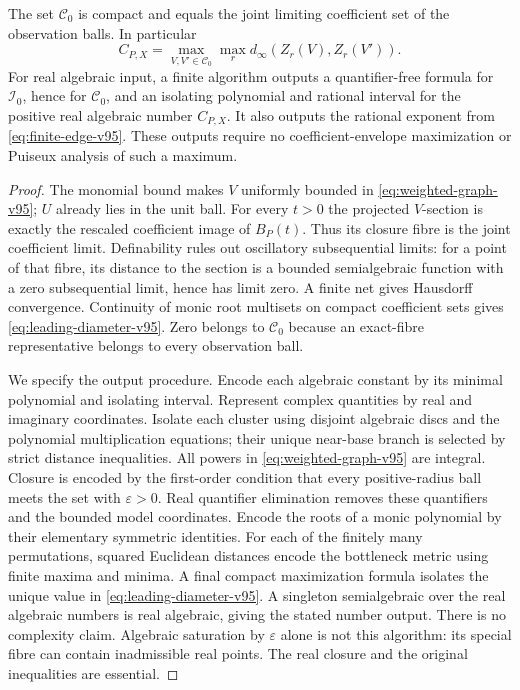 \begin{proposition}
\label{prop:effective-fibre-v95}
The set $\mathscr C_0$ is compact and equals the joint limiting
coefficient set of the observation balls. In particular
\begin{equation}\label{eq:leading-diameter-v95}
 C_{P,X}=\max_{V,V'\in\mathscr C_0}\max_r
                    d_\infty(Z_r(V),Z_r(V')).
\end{equation}
For real algebraic input, a finite algorithm outputs a quantifier-free
formula for $\mathscr I_0$, hence for $\mathscr C_0$, and an isolating
polynomial and rational interval for the positive real algebraic number
$C_{P,X}$. It also outputs the rational exponent from
\eqref{eq:finite-edge-v95}. These outputs require no coefficient-envelope
maximization or Puiseux analysis of such a maximum.
\end{proposition}
\begin{proof}
The monomial bound makes $V$ uniformly bounded in
\eqref{eq:weighted-graph-v95}; $U$ already lies in the unit ball.
For every $t>0$ the projected $V$-section is exactly the rescaled
coefficient image of $B_P(t)$. Thus its closure fibre is the joint
coefficient limit. Definability rules out oscillatory subsequential
limits: for a point of that fibre, its distance to the section is a
bounded semialgebraic function with a zero subsequential limit, hence
has limit zero. A finite net gives Hausdorff convergence. Continuity of
monic root multisets on compact coefficient sets gives
\eqref{eq:leading-diameter-v95}. Zero belongs to $\mathscr C_0$ because
an exact-fibre representative belongs to every observation ball.

We specify the output procedure. Encode each algebraic constant by its
minimal polynomial and isolating interval. Represent complex quantities
by real and imaginary coordinates. Isolate each cluster using disjoint
algebraic discs and the polynomial multiplication equations; their
unique near-base branch is selected by strict distance inequalities.
All powers in \eqref{eq:weighted-graph-v95} are integral. Closure is
encoded by the first-order condition that every positive-radius ball
meets the set with $\varepsilon>0$. Real quantifier elimination removes
these quantifiers and the bounded model coordinates. Encode the roots
of a monic polynomial by their elementary symmetric identities. For
each of the finitely many permutations, squared Euclidean distances
encode the bottleneck metric using finite maxima and minima. A final
compact maximization formula isolates the unique value in
\eqref{eq:leading-diameter-v95}. A singleton semialgebraic over the real
algebraic numbers is real algebraic, giving the stated number output.
There is no complexity claim. Algebraic saturation by $\varepsilon$
alone is not this algorithm: its special fibre can contain inadmissible
real points. The real closure and the original inequalities are essential.
\end{proof}

